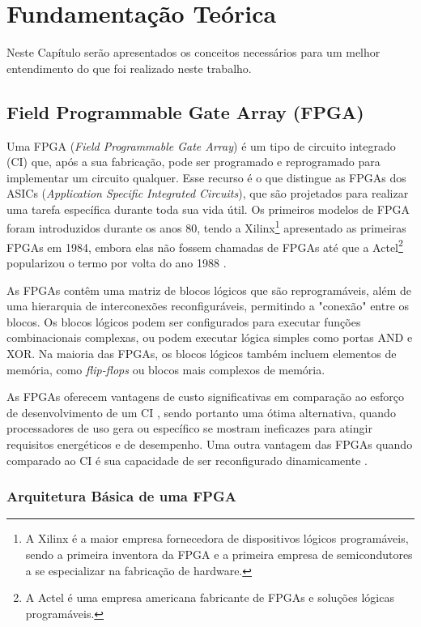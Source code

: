 \chapter{Fundamentação Teórica}
\label{cap:fundamentacao-teorica}
Neste Capítulo serão apresentados  os conceitos necessários para um melhor entendimento do que foi realizado neste trabalho.

\section{Field Programmable Gate Array (FPGA)}\label{sec:fpga}

Uma FPGA (\textit{Field Programmable Gate Array}) é um tipo de circuito integrado (CI) que, após a sua fabricação, pode ser programado e reprogramado para implementar um circuito qualquer. Esse recurso é o que distingue as FPGAs dos ASICs (\textit{Application Specific Integrated Circuits}), que são projetados para realizar uma tarefa específica durante toda sua vida útil. Os primeiros modelos de FPGA foram introduzidos durante os anos 80, tendo a Xilinx\footnote{A Xilinx é a maior empresa fornecedora de dispositivos lógicos programáveis, sendo a primeira inventora da FPGA e a primeira empresa de semicondutores a se especializar na fabricação de hardware.} apresentado as primeiras FPGAs em 1984, embora elas não fossem chamadas de FPGAs até que a Actel\footnote{A Actel é uma empresa americana fabricante de FPGAs e soluções lógicas programáveis.} popularizou o termo por volta do ano 1988 \cite{7086413}. 

As FPGAs contêm uma matriz de blocos lógicos que são reprogramáveis, além de uma hierarquia de interconexões reconfiguráveis, permitindo a "conexão" entre os blocos. Os blocos lógicos podem ser configurados para executar funções combinacionais complexas, ou podem executar lógica simples como portas AND e XOR. Na maioria das FPGAs, os blocos lógicos também incluem elementos de memória, como \textit{flip-flops} ou blocos mais complexos de memória.

As FPGAs oferecem vantagens de custo significativas em comparação ao esforço de desenvolvimento de um CI \cite{8119247}, sendo portanto uma ótima alternativa, quando processadores de uso gera ou específico se mostram ineficazes para atingir requisitos energéticos e de desempenho. Uma outra vantagem das FPGAs quando comparado ao CI é sua capacidade de ser reconfigurado dinamicamente \cite{fpgaxilinx}.



\subsection{Arquitetura Básica de uma FPGA}\label{sec:fpgaarquitetura}

